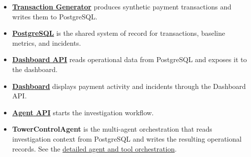 \documentclass[11pt]{article}
\begin{document}
\begin{itemize}
  \item \href{https://github.com/gaston-lm/tcp-nextwave-hackathon/blob/main/scripts/ingestion/generator/README.md}{\textbf{Transaction Generator}} produces synthetic payment transactions and writes them to PostgreSQL.
  \item \href{https://github.com/gaston-lm/tcp-nextwave-hackathon/blob/main/data/README.md}{\textbf{PostgreSQL}} is the shared system of record for transactions, baseline metrics, and incidents.
  \item \href{https://github.com/gaston-lm/tcp-nextwave-hackathon/blob/main/services/dashboard_api/README.md}{\textbf{Dashboard API}} reads operational data from PostgreSQL and exposes it to the dashboard.
  \item \href{https://github.com/gaston-lm/tcp-nextwave-hackathon/blob/main/apps/dashboard/README.md}{\textbf{Dashboard}} displays payment activity and incidents through the Dashboard API.
  \item \href{https://github.com/gaston-lm/tcp-nextwave-hackathon/blob/main/services/agent_api/README.md}{\textbf{Agent API}} starts the investigation workflow.
  \item \textbf{TowerControlAgent} is the multi-agent orchestration that reads investigation context from PostgreSQL and writes the resulting operational records. See the \href{https://github.com/gaston-lm/tcp-nextwave-hackathon/blob/main/services/agent_api/README.md#orchestration}{detailed agent and tool orchestration}.
\end{itemize}
\end{document}
